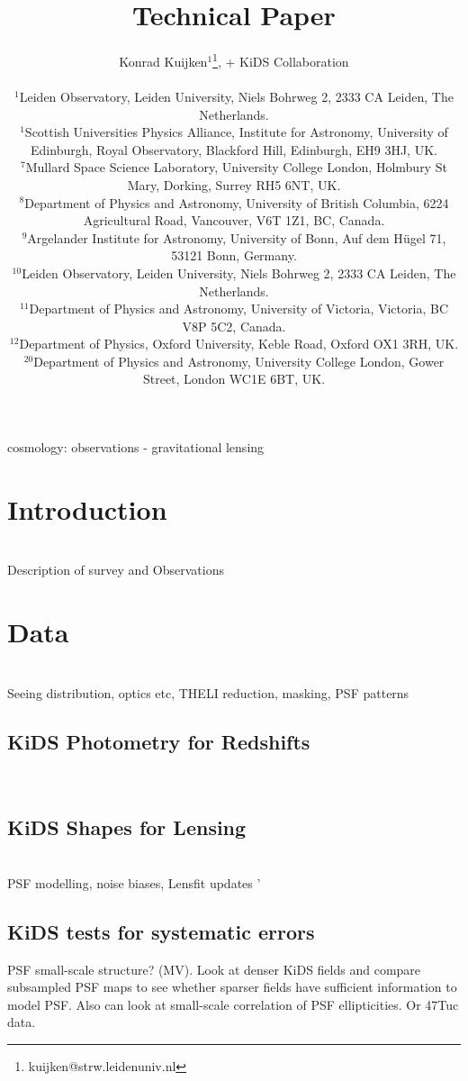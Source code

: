 \documentclass[useAMS,usenatbib,times,letter,amssymb]{mn2e}
\title[KiDS]{Technical Paper}
\author[K. Kuijken et al.]{Konrad Kuijken$^{1}$\thanks{kuijken@strw.leidenuniv.nl}, + KiDS Collaboration\\
\\
$^{1}$Leiden Observatory, Leiden University, Niels Bohrweg 2, 2333 CA Leiden, The Netherlands.\\
$^1$Scottish Universities Physics Alliance, Institute for Astronomy, University of Edinburgh, Royal Observatory, Blackford Hill, Edinburgh, EH9 3HJ, UK.\\ 
$^7$Mullard Space Science Laboratory, University College London, Holmbury St Mary, Dorking, Surrey RH5 6NT, UK.\\
$^8$Department of Physics and Astronomy, University of British Columbia, 6224 Agricultural Road, Vancouver, V6T 1Z1, BC, Canada.\\  
$^9$Argelander Institute for Astronomy, University of Bonn, Auf dem H{\"u}gel 71, 53121 Bonn, Germany.\\
$^{10}$Leiden Observatory, Leiden University, Niels Bohrweg 2, 2333 CA Leiden, The Netherlands.\\
$^{11}$Department of Physics and Astronomy, University of Victoria, Victoria, BC V8P 5C2, Canada.\\
$^{12}$Department of Physics, Oxford University, Keble Road, Oxford OX1 3RH, UK.\\ 
$^{20}$Department of Physics and Astronomy, University College London, Gower Street, London WC1E 6BT, UK.\\
}
\newcommand{\red}[1]{{\color{red}{#1}}}
\begin{document}
\maketitle

\begin{abstract}

\end{abstract}


\begin{keywords}
cosmology: observations - gravitational lensing 
\end{keywords}

\section{Introduction}
\label{sec:intro}
\red{KK/JdJ} \\

Description of survey and Observations

\section{Data}
\red{KK/JdJ/TE} \\

Seeing distribution, optics etc, THELI reduction, masking, PSF patterns

\subsection{KiDS Photometry for Redshifts}
\red{KK,HH/AC}\\



\red{Hendrik: photz's}

\subsection{KiDS Shapes for Lensing}
\red{CH/LM/RN}\\

PSF modelling, noise biases, Lensfit updates '\\


\subsection{KiDS tests for systematic errors}
\red{CH/CB/KK/AC}

PSF small-scale structure? (MV). Look at denser KiDS fields and compare subsampled PSF maps to see whether sparser fields have sufficient information to model PSF. Also can look at small-scale correlation of PSF ellipticities. Or 47Tuc data.
\end{document}
